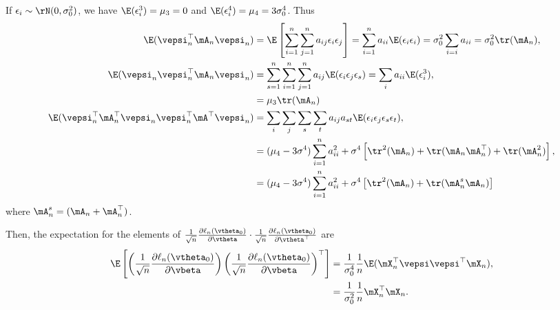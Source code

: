 \documentclass[english,12pt]{book}\usepackage[]{graphicx}\usepackage[]{xcolor}
\begin{document}
\begin{subappendices}
If $\epsilon_i \sim \rN(0, \sigma_0^2)$, we have $\E(\epsilon_i^3) = \mu_3 = 0$ and $\E(\epsilon_i^4) = \mu_4 = 3\sigma_0^4$. Thus
\begin{equation}\label{eq:moments-linear-cuadratic}
\begin{aligned}
  \E(\vepsi_n^\top\mA_n\vepsi_n) & = \E\left[\sum_{i = 1}^n\sum_{j = 1}^na_{ij}\epsilon_i\epsilon_j\right] = \sum_{i = 1}^na_{ii}\E(\epsilon_i\epsilon_i) = \sigma^2_0\sum_{i = i}a_{ii} = \sigma_0^2\tr(\mA_n), \\
  \E(\vepsi_n\vepsi_n^\top\mA_n\vepsi_n) & = \sum_{s = 1}^n\sum_{i = 1}^n\sum_{j = 1}^n a_{ij}\E(\epsilon_i\epsilon_j\epsilon_s) = \sum_i a_{ii}\E(\epsilon_i^3), \\
  & =  \mu_3\tr(\mA_n) \\
\E(\vepsi_n^\top\mA_n^\top\vepsi_n\vepsi_n^\top\mA^\top\vepsi_n) & = \sum_i\sum_j\sum_s\sum_ta_{ij}a_{st}\E(\epsilon_i\epsilon_j\epsilon_s\epsilon_t), \\
& = (\mu_4 - 3\sigma^4)\sum_{i = 1}^na_{ii}^2 + \sigma^4\left[\tr^2(\mA_n) + \tr(\mA_n\mA_n^\top)+\tr(\mA_n^2)\right], \\
& = (\mu_4 - 3\sigma^4)\sum_{i = 1}^na_{ii}^2 + \sigma^4\left[\tr^2(\mA_n) + \tr(\mA_n^s\mA_n)\right] 
\end{aligned}
\end{equation}
%
where $\mA_n^s = (\mA_n + \mA_n^\top)$.

Then, the expectation for the elements of $  \frac{1}{\sqrt{n}}\frac{\partial \ell_n (\vtheta_0)}{\partial \vtheta}\cdot\frac{1}{\sqrt{n}}\frac{\partial \ell_n (\vtheta_0)}{\partial \vtheta^\top}$ are
\begin{equation}
\begin{aligned}
\E\left[\left(\frac{1}{\sqrt{n}}\frac{\partial \ell_n(\vtheta_0)}{\partial \vbeta}\right) \left(\frac{1}{\sqrt{n}}\frac{\partial \ell_n(\vtheta_0)}{\partial \vbeta}\right)^\top\right] & = \frac{1}{\sigma_0^4}\frac{1}{n}\E(\mX_n^\top\vepsi\vepsi^\top\mX_n), \\
& = \frac{1}{\sigma_0^2}\frac{1}{n}\mX_n^\top\mX_n.
\end{aligned}
\end{equation}


\end{subappendices}
\end{document}
